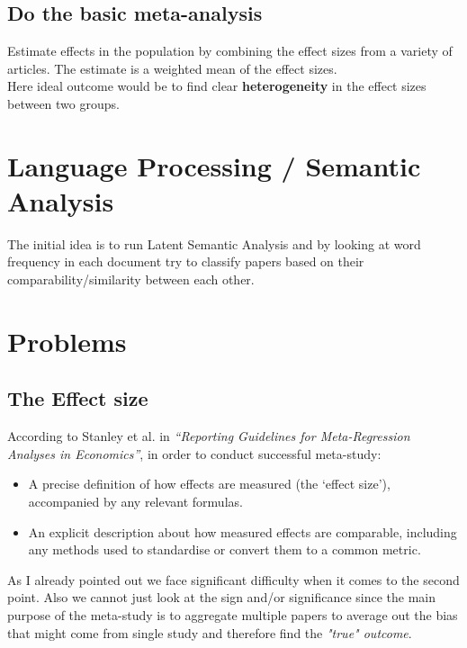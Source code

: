 \documentclass{article}
\begin{document}
\subsection*{Do the basic meta-analysis}
Estimate effects in the population by combining
the effect sizes from a variety of articles. The estimate is a weighted mean of the effect sizes. \\

\newline \noindent
Here ideal outcome would be to find clear \textbf{heterogeneity} in the effect sizes between two groups.



\section{Language Processing / Semantic Analysis}
The initial idea is to run Latent Semantic Analysis and by looking at word frequency in each document try to classify papers based on their comparability/similarity between each other.

\section{Problems}

\subsection*{The Effect size}

According to Stanley et al. in \textit{“Reporting Guidelines for Meta-Regression Analyses in Economics”}, in order to conduct successful meta-study:
\begin{itemize}
    \item A precise definition of how effects are measured (the ‘effect size’), accompanied by any relevant formulas.
    \item An explicit description about how measured effects are comparable, including any methods used to standardise or convert them to a common metric.
\end{itemize}

\newline \noindent
As I already pointed out we face significant difficulty when it comes to the second point. Also we cannot just look at the sign and/or significance since the main purpose of the meta-study is to aggregate multiple papers to average out the bias that might come from single study and therefore find the \textit{"true" outcome}.   \\
\end{document}
